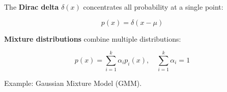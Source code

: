 The \textbf{Dirac delta} $\delta(x)$ concentrates all probability at a single point:

\begin{equation}
p(x) = \delta(x - \mu)
\end{equation}

\textbf{Mixture distributions} combine multiple distributions:

\begin{equation}
p(x) = \sum_{i=1}^{k} \alpha_i p_i(x), \quad \sum_{i=1}^{k} \alpha_i = 1
\end{equation}

Example: Gaussian Mixture Model (GMM).
